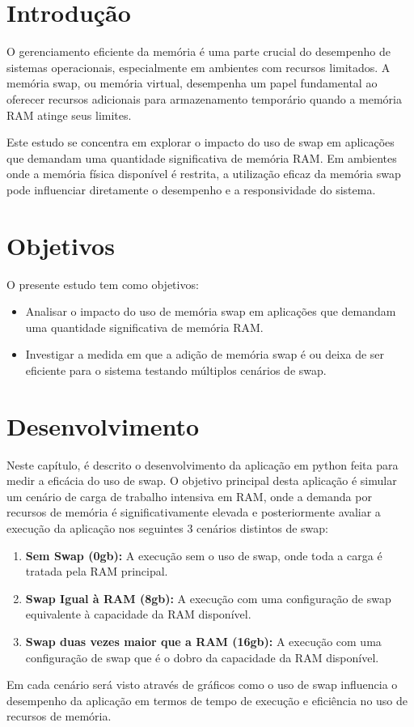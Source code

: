 \documentclass[
	12pt,				%
	openright,			%
	oneside,			%
	a4paper,			%
	chapter=TITLE,		%
	english,			%
	french,				%
	spanish,			%
	brazil				%
	]{abntex2}
\theoremstyle{definition}
\begin{document}

\chapter{Introdução}

O gerenciamento eficiente da memória é uma parte crucial do desempenho de sistemas operacionais, 
especialmente em ambientes com recursos limitados. A memória swap, ou memória virtual, desempenha um papel fundamental ao 
oferecer recursos adicionais para armazenamento temporário quando a memória RAM atinge seus limites.

Este estudo se concentra em explorar o impacto do uso de swap em aplicações que demandam 
uma quantidade significativa de memória RAM. Em ambientes onde a memória física disponível 
é restrita, a utilização eficaz da memória swap pode influenciar diretamente o desempenho 
e a responsividade do sistema.

\chapter{Objetivos}

O presente estudo tem como objetivos:

\begin{itemize}
    \item Analisar o impacto do uso de memória swap em aplicações que demandam uma quantidade significativa de memória RAM.
    \item Investigar a medida em que a adição de memória swap é ou deixa de ser eficiente para o sistema testando múltiplos cenários de swap.
\end{itemize}


\chapter{Desenvolvimento}

Neste capítulo, é descrito o desenvolvimento da aplicação em python feita para medir a eficácia do uso de swap. 
O objetivo principal desta aplicação é simular um cenário de carga de trabalho intensiva em 
RAM, onde a demanda por recursos de memória é significativamente elevada e posteriormente avaliar a 
execução da aplicação nos seguintes 3 cenários distintos de swap:

\begin{enumerate}
    \item \textbf{Sem Swap (0gb):} A execução sem o uso de swap, onde toda a carga é tratada pela RAM principal.
    \item \textbf{Swap Igual à RAM (8gb):} A execução com uma configuração de swap equivalente à capacidade da RAM disponível.
    \item \textbf{Swap duas vezes maior que a RAM (16gb):} A execução com uma configuração de swap que é o dobro da capacidade da RAM disponível.
\end{enumerate}
Em cada cenário será visto através de gráficos como o uso de swap influencia o desempenho da aplicação 
em termos de tempo de execução e eficiência no uso de recursos de memória.
\end{document}
